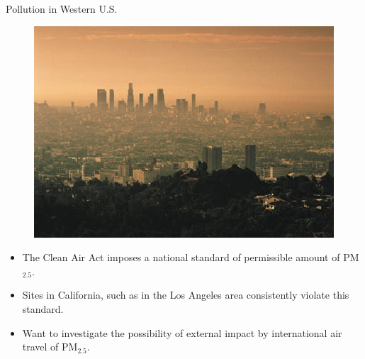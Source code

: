 \documentclass[notheorems,envcountsect,allowframebreaks,xcolor=svgnames,8pt]{beamer}
\begin{document}
\begin{frame}{Pollution in Western U.S.}
\begin{figure}[H]
\centering
\includegraphics[scale=0.45]{smog.png}
\end{figure}
\begin{itemize}
\item The Clean Air Act imposes a national standard of permissible amount of PM$_{2.5}$. 
\item Sites in California, such as in the Los Angeles area consistently violate this standard.
\item Want to investigate the possibility of external impact by international air travel of PM$_{2.5}$.
\end{itemize}
\end{frame}




%

\end{document}
